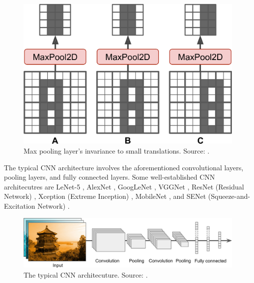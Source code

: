 \documentclass[a4paper, 11pt, oneside]{article}
\begin{document}
  \begin{figure}[ht]
    \begin{center}
      \includegraphics[width=.8\textwidth]{max_pooling_invariance.png}
    \end{center}
    \caption{Max pooling layer's invariance to small translations. Source: \cite{geron2019hands}.}
  \end{figure}

  The typical CNN architecture involves the aforementioned convolutional layers, pooling layers, and fully connected layers.
  Some well-established CNN architecutres are LeNet-5 \cite{lecun1998gradient}, AlexNet \cite{krizhevsky2012imagenet},
  GoogLeNet \cite{szegedy2015going}, VGGNet \cite{simonyan2014very}, ResNet (Residual Network) \cite{he2016deep}, Xception
  (Extreme Inception) \cite{chollet2017xception}, MobileNet \cite{howard2017mobilenets, sandler2018mobilenetv2},
  and SENet (Squeeze-and-Excitation Network) \cite{hu2018squeeze}.

  \begin{figure}[ht]
    \begin{center}
      \includegraphics[width=.8\textwidth]{typical_cnn.png}
    \end{center}
    \caption{The typical CNN architecuture. Source: \cite{geron2019hands}.}
  \end{figure}
\end{document}
